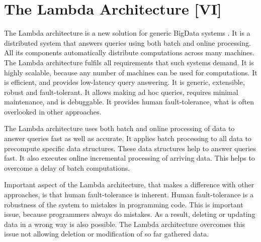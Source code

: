 \chapter{The Lambda Architecture [VI]}
\label{chap:lambda_architecture}


The Lambda architecture is a new solution for generic BigData systems \cite{Marz2014}.
It is a distributed system that answers queries using both batch and online processing.
All its components automatically distribute computations across many machines.
The Lambda architecture fulfils all requirements that such systems demand.
It is highly scalable, because any number of machines can be used for computations.
It is efficient, and provides low-latency query answering.
It is generic, extensible, robust and fault-tolerant.
It allows making ad hoc queries, requires minimal maintenance, and is debuggable.
It provides human fault-tolerance, what is often overlooked in other approaches.

The Lambda architecture uses both batch and online processing of data to answer queries fast as well as accurate.
It applies batch processing to all data to precompute specific data structures.
These data structures help to answer queries fast.
It also executes online incremental processing of arriving data.
This helps to overcome a delay of batch computations.

Important aspect of the Lambda architecture, that makes a difference with other approaches, is that human fault-tolerance is inherent.
Human fault-tolerance is a robustness of the system to mistakes in programming code.
This is important issue, because programmers always do mistakes.
As a result, deleting or updating data in a wrong way is also possible.
The Lambda architecture overcomes this issue not allowing deletion or modification of so far gathered data.




